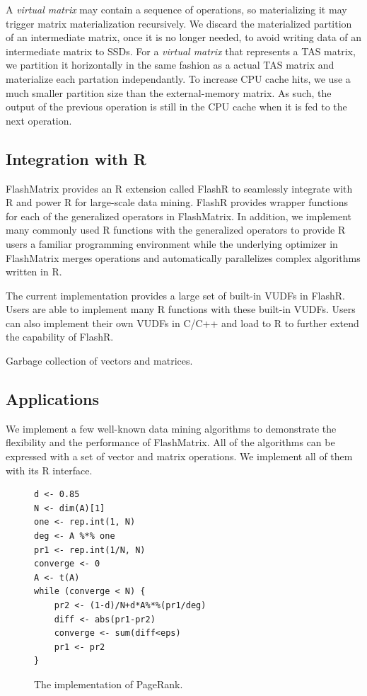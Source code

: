 A \textit{virtual matrix} may contain a sequence of operations, so materializing
it may trigger matrix materialization recursively. We discard the materialized
partition of an intermediate matrix, once it is no longer needed, to avoid
writing data of an intermediate matrix to SSDs. For a \textit{virtual matrix}
that represents a TAS matrix, we partition it horizontally in the same fashion
as a actual TAS matrix and materialize each partation independantly. To increase
CPU cache hits, we use a much smaller partition size than
the external-memory matrix. As such, the output of the previous operation is
still in the CPU cache when it is fed to the next operation.


\subsection{Integration with R}

FlashMatrix provides an R extension called FlashR to seamlessly integrate with
R and power R for large-scale data mining. FlashR provides wrapper functions
for each of the generalized operators
in FlashMatrix. In addition, we implement many commonly used R functions with
the generalized operators to provide R users a familiar programming environment
while the underlying optimizer in FlashMatrix merges operations and
automatically parallelizes complex algorithms written in R.

The current implementation provides a large set of built-in VUDFs in FlashR.
Users are able to implement many R functions with these built-in VUDFs.
Users can also implement their own VUDFs in C/C++ and load to R to further
extend the capability of FlashR.

Garbage collection of vectors and matrices.

\subsection{Applications}

We implement a few well-known data mining algorithms to demonstrate
the flexibility and the performance of FlashMatrix. All of the algorithms
can be expressed with a set of vector and matrix operations. We implement
all of them with its R interface.

\begin{figure}[t]
\begin{verbatim}
d <- 0.85
N <- dim(A)[1]
one <- rep.int(1, N)
deg <- A %*% one
pr1 <- rep.int(1/N, N)
converge <- 0
A <- t(A)
while (converge < N) {
	pr2 <- (1-d)/N+d*A%*%(pr1/deg)
	diff <- abs(pr1-pr2)
	converge <- sum(diff<eps)
	pr1 <- pr2
}
\end{verbatim}
\vspace{-5pt}
\caption{The implementation of PageRank.}
\label{fig:pagerank}
\end{figure}

